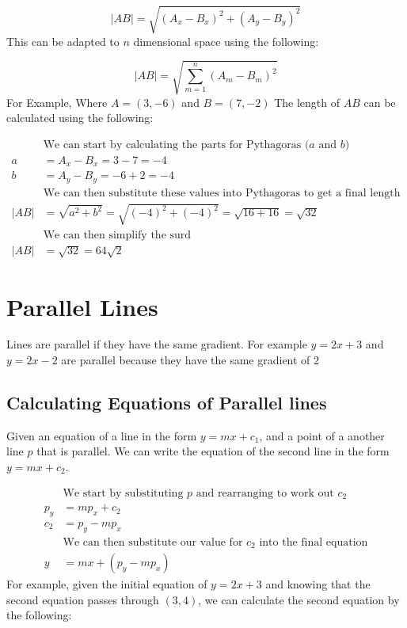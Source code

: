 \documentclass[a4paper]{article}
\begin{document}
\begin{equation}
	|AB| = \sqrt{(A_x - B_x)^2 + (A_y - B_y)^2}
\end{equation}
This can be adapted to $n$ dimensional space using the following:

\begin{equation}
	|AB| = \sqrt{\sum_{m = 1}^{n} (A_m - B_m)^2}
\end{equation}
For Example,
Where $A = (3, -6)$ and $B = (7, -2)$ The length of $AB$ can be calculated using the following:

\begin{align*}
	&\text{We can start by calculating the parts for Pythagoras ($a$ and $b$)}\\
	a &= A_x - B_x = 3 - 7 = -4\\
	b &= A_y - B_y = -6 + 2 = -4 \\
	&\text{We can then substitute these values into Pythagoras to get a final length}\\
	|AB| &= \sqrt{a^2 + b^2} = \sqrt{(-4)^2 + (-4)^2} = \sqrt{16 + 16} = \sqrt{32}\\
	&\text{We can then simplify the surd}\\
	|AB| &= \sqrt{32} = 64\sqrt{2}
\end{align*}


\section{Parallel Lines}
Lines are parallel if they have the same gradient. For example $y = 2x + 3$ and $y = 2x - 2$ are parallel because they
have the same gradient of $2$

\subsection{Calculating Equations of Parallel lines}
Given an equation of a line in the form  $y = mx + c_1$, and a point of a another line $p$ that is parallel.
We can write the equation of the second line in the form $y = mx + c_2$.

\begin{align*}
	&\text{We start by substituting $p$ and rearranging to work out $c_2$}\\
	p_y &= mp_x + c_2 \\
	c_2 &= p_y - mp_x \\
	&\text{We can then substitute our value for $c_2$ into the final equation}\\
	y &= mx + (p_y - mp_x)
\end{align*}
For example, given the initial equation of $y = 2x + 3$ and knowing that the second equation passes through $(3, 4)$,
we can calculate the second equation by the following:
\end{document}
